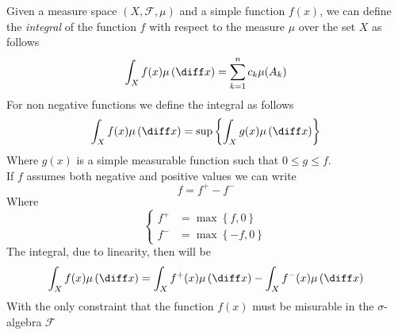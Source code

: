 \documentclass[../mmf.tex]{subfiles}
\begin{document}
\begin{dfn}[Integral]
	Given a measure space $(X,\mathcal{F},\mu)$ and a simple function $f(x)$, we can define the \textit{integral} of the function $f$ with respect to the measure $\mu$ over the set $X$ as follows
	\begin{equation}
		\int_{X}^{}f(x)\mu\left( \diff x \right)=\sum_{k=1}^nc_k\mu(A_k)
		\label{eq:integral}
	\end{equation}
	For non negative functions we define the integral as follows
	\begin{equation}
		\int_{X}^{}f(x)\mu\left( \diff x \right)=\sup\left\{ \int_{X}^{}g(x)\mu\left( \diff x \right) \right\}
		\label{eq:integralnonneg}
	\end{equation}
	Where $g(x)$ is a simple measurable function such that $0\le g\le f$.\\
	If $f$ assumes both negative and positive values we can write
	\begin{equation}
		f=f^+-f^-
		\label{eq:negposfunc}
	\end{equation}
	Where
	\begin{equation}
		\left\{ \begin{aligned}
				f^+&=\max\left\{f,0\right\}\\
				f^-&=\max\left\{-f,0\right\}
		\end{aligned}\right.
		\label{eq:f+f-lebesgue}
	\end{equation}
	The integral, due to linearity, then will be
	\begin{equation}
		\int_{X}^{}f(x)\mu\left( \diff x \right)=\int_{X}^{}f^+(x)\mu\left( \diff x \right)-\int_{X}^{}f^-(x)\mu\left( \diff x \right)
		\label{eq:f+f-int}
	\end{equation}
	With the only constraint that the function $f(x)$ must be misurable in the $\sigma$-algebra $\mathcal{F}$
\end{dfn}
\end{document}
